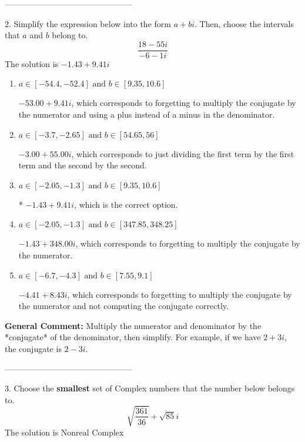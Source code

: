 \documentclass{extbook}[14pt]
\begin{document}
-----------------------------------------------

2. Simplify the expression below into the form $a+bi$. Then, choose the intervals that $a$ and $b$ belong to.
\[ \frac{18 - 55 i}{-6 - 1 i} \] 
The solution is $ -1.43  + 9.41 i $ 

\begin{enumerate}[label=\Alph*.] 
\item $ a \in [-54.4, -52.4] \text{ and } b \in [9.35, 10.6] $ 

  $-53.00  + 9.41 i$, which corresponds to forgetting to multiply the conjugate by the numerator and using a plus instead of a minus in the denominator. 
\item $ a \in [-3.7, -2.65] \text{ and } b \in [54.65, 56] $ 

  $-3.00  + 55.00 i$, which corresponds to just dividing the first term by the first term and the second by the second. 
\item $ a \in [-2.05, -1.3] \text{ and } b \in [9.35, 10.6] $ 

 * $-1.43  + 9.41 i$, which is the correct option. 
\item $ a \in [-2.05, -1.3] \text{ and } b \in [347.85, 348.25] $ 

  $-1.43  + 348.00 i$, which corresponds to forgetting to multiply the conjugate by the numerator. 
\item $ a \in [-6.7, -4.3] \text{ and } b \in [7.55, 9.1] $ 

  $-4.41  + 8.43 i$, which corresponds to forgetting to multiply the conjugate by the numerator and not computing the conjugate correctly. 
\end{enumerate} 
 
\textbf{General Comment:} Multiply the numerator and denominator by the *conjugate* of the denominator, then simplify. For example, if we have $2+3i$, the conjugate is $2-3i$. 

-----------------------------------------------

3. Choose the \textbf{smallest} set of Complex numbers that the number below belongs to.
\[ \sqrt{\frac{361}{36}}+\sqrt{85} i \] 
The solution is $ \text{Nonreal Complex} $ 
\end{document}
